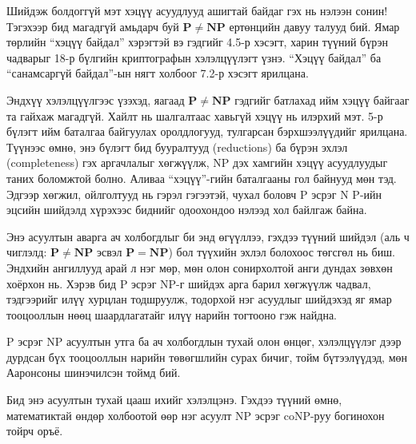 Шийдэж болдоггүй мэт хэцүү асуудлууд ашигтай байдаг гэх нь нэлээн сонин! Тэгэхээр бид магадгүй амьдарч буй $\mathbf{P} \ne \mathbf{NP}$ ертөнцийн давуу талууд бий. Ямар төрлийн “хэцүү байдал” хэрэгтэй вэ гэдгийг 4.5-р хэсэгт, харин түүний бүрэн чадварыг 18-р бүлгийн криптографын хэлэлцүүлэгт үзнэ. “Хэцүү байдал” ба “санамсаргүй байдал”-ын нягт холбоог 7.2-р хэсэгт ярилцана.


Эндхүү хэлэлцүүлгээс үзэхэд, яагаад $\mathbf{P} \ne \mathbf{NP}$ гэдгийг батлахад ийм хэцүү байгааг та гайхаж магадгүй. Хайлт нь шалгалтаас хавьгүй хэцүү нь илэрхий мэт. 5-р бүлэгт ийм баталгаа байгуулах оролдлогууд, тулгарсан бэрхшээлүүдийг ярилцана. Түүнээс өмнө, энэ бүлэгт бид бууралтууд (reductions) ба бүрэн эхлэл (completeness) гэх аргачлалыг хөгжүүлж, NP дэх хамгийн хэцүү асуудлуудыг таних боломжтой болно. Аливаа “хэцүү”-гийн баталгааны гол байнууд мөн тэд. Эдгээр хөгжил, ойлголтууд нь гэрэл гэгээтэй, чухал боловч P эсрэг N P-ийн эцсийн шийдэлд хүрэхээс биднийг одоохондоо нэлээд хол байлгаж байна.


Энэ асуултын аварга ач холбогдлыг би энд өгүүллээ, гэхдээ түүний шийдэл (аль ч чиглэлд: $\mathbf{P} \ne \mathbf{NP}$ эсвэл $\mathbf{P} = \mathbf{NP}$) бол түүхийн эхлэл болохоос төгсгөл нь биш. Эндхийн ангиллууд арай л нэг мөр, мөн олон сонирхолтой анги дундах зөвхөн хоёрхон нь. Хэрэв бид P эсрэг NP-г шийдэх арга барил хөгжүүлж чадвал, тэдгээрийг илүү хурцлан тодшруулж, тодорхой нэг асуудлыг шийдэхэд яг ямар тооцооллын нөөц шаардлагатайг илүү нарийн тогтооно гэж найдна.


P эсрэг NP асуултын утга ба ач холбогдлын тухай олон өнцөг, хэлэлцүүлэг дээр дурдсан бүх тооцооллын нарийн төвөгшлийн сурах бичиг, тойм бүтээлүүдэд, мөн Ааронсоны шинэчилсэн тоймд \cite{Aar16b} бий.


Бид энэ асуултын тухай цааш ихийг хэлэлцэнэ. Гэхдээ түүний өмнө, математиктай өндөр холбоотой өөр нэг асуулт NP эсрэг coNP-руу богинохон тойрч оръё.




